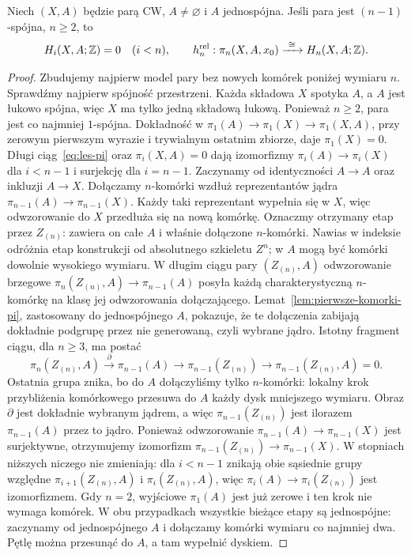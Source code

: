 \begin{twierdzenie}
\label{thm:hurewicz-wzgledny}
Niech $(X,A)$ będzie parą CW,
$A\ne\varnothing$ i $A$
jednospójna. Jeśli para
jest $(n-1)$-spójna,
$n\geq2$, to
\[
 H_i(X,A;\mathbb{Z})=0\quad(i<n),
 \qquad
 h_n^{\mathrm{rel}}:
 \pi_n(X,A,x_0)
 \xrightarrow{\ \cong\ }
 H_n(X,A;\mathbb{Z}).
\]
\end{twierdzenie}
\begin{proof}
Zbudujemy najpierw
model pary bez nowych
komórek poniżej
wymiaru $n$.
Sprawdźmy najpierw spójność przestrzeni. Każda składowa $X$
spotyka $A$, a $A$ jest łukowo spójna, więc $X$ ma tylko jedną
składową łukową. Ponieważ $n\geq2$, para jest co najmniej
$1$-spójna. Dokładność w
$\pi_1(A)\to\pi_1(X)\to\pi_1(X,A)$, przy zerowym pierwszym
wyrazie i trywialnym ostatnim zbiorze, daje $\pi_1(X)=0$.
Długi ciąg~\eqref{eq:les-pi}
oraz $\pi_i(X,A)=0$
dają izomorfizmy
$\pi_i(A)\to\pi_i(X)$
dla $i<n-1$ i
surjekcję dla
$i=n-1$.
Zaczynamy od
identyczności $A\to A$
oraz inkluzji $A\to X$.
Dołączamy $n$-komórki
wzdłuż reprezentantów
jądra
$\pi_{n-1}(A)\to
\pi_{n-1}(X)$.
Każdy taki reprezentant
wypełnia się w $X$,
więc odwzorowanie do $X$
przedłuża się na
nową komórkę.
Oznaczmy otrzymany etap przez $Z_{(n)}$: zawiera on całe $A$
i właśnie dołączone $n$-komórki. Nawias w indeksie odróżnia
etap konstrukcji od absolutnego szkieletu $Z^n$; w $A$ mogą
być komórki dowolnie wysokiego wymiaru.
W długim ciągu pary $(Z_{(n)},A)$ odwzorowanie brzegowe
$\pi_n(Z_{(n)},A)\to\pi_{n-1}(A)$
posyła każdą
charakterystyczną
$n$-komórkę na
klasę jej odwzorowania
dołączającego.
Lemat~\ref{lem:pierwsze-komorki-pi},
zastosowany do
jednospójnego $A$,
pokazuje, że
te dołączenia
zabijają dokładnie
podgrupę przez
nie generowaną,
czyli wybrane jądro.
Istotny fragment ciągu, dla $n\geq3$, ma postać
\[
 \pi_n(Z_{(n)},A)\xrightarrow{\ \partial\ }
 \pi_{n-1}(A)\longrightarrow\pi_{n-1}(Z_{(n)})
 \longrightarrow\pi_{n-1}(Z_{(n)},A)=0.
\]
Ostatnia grupa znika, bo do $A$ dołączyliśmy tylko $n$-komórki:
lokalny krok przybliżenia komórkowego przesuwa do $A$
każdy dysk mniejszego wymiaru. Obraz $\partial$ jest dokładnie
wybranym jądrem, a więc $\pi_{n-1}(Z_{(n)})$ jest ilorazem
$\pi_{n-1}(A)$ przez to jądro. Ponieważ odwzorowanie
$\pi_{n-1}(A)\to\pi_{n-1}(X)$ jest surjektywne,
otrzymujemy izomorfizm $\pi_{n-1}(Z_{(n)})\to\pi_{n-1}(X)$.
W stopniach
niższych niczego
nie zmieniają: dla $i<n-1$ znikają obie sąsiednie grupy względne
$\pi_{i+1}(Z_{(n)},A)$ i $\pi_i(Z_{(n)},A)$, więc
$\pi_i(A)\to\pi_i(Z_{(n)})$ jest izomorfizmem.
Gdy $n=2$,
wyjściowe $\pi_1(A)$
jest już zerowe
i ten krok nie
wymaga komórek.
W obu przypadkach wszystkie bieżące etapy są jednospójne:
zaczynamy od jednospójnego $A$ i dołączamy komórki wymiaru
co najmniej dwa. Pętlę można przesunąć do $A$, a tam wypełnić dyskiem.


\end{proof}
